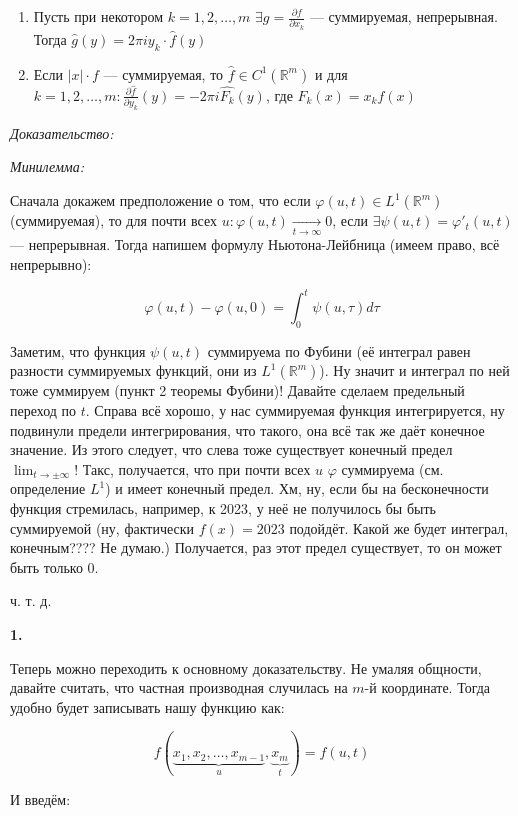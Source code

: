 \documentclass{article}
\def\dbl{\,\,}
\def\goesto#1{\underset{#1}{\longrightarrow}}
\begin{document}
\begin{enumerate}
    \item Пусть при некотором $k = 1, 2, \ldots, m \dbl \exists g = \frac{\partial f}{\partial x_k}$ --- суммируемая, непрерывная. Тогда $\hat{g}(y) = 2 \pi i y_k \cdot \hat{f}(y)$
    \item Если $|x| \cdot f$ --- суммируемая, то $\hat{f} \in C^1(\mathbb{R}^m)$ и для $k = 1, 2, \ldots, m: \frac{\partial \hat{f}}{\partial y_k}(y) = -2\pi i \hat{F_k}(y)$, где $F_k(x) = x_kf(x)$
\end{enumerate}

\textit{Доказательство:}

\textit{Минилемма:}

Сначала докажем предположение о том, что если $\varphi(u, t) \in L^1(\mathbb{R}^m)$ (суммируемая), то для почти всех $u : \varphi(u, t) \goesto{t \rightarrow \infty} 0$, если $\exists \psi(u, t) = \varphi'_t(u, t)$ --- непрерывная. Тогда напишем формулу Ньютона-Лейбница (имеем право, всё непрерывно):

\[\varphi(u, t) - \varphi(u, 0) = \int_{0}^{t} \psi(u, \tau) d\tau \]

Заметим, что функция $\psi(u, t)$ суммируема по Фубини (её интеграл равен разности суммируемых функций, они из $L^1(\mathbb{R}^m)$). Ну значит и интеграл по ней тоже суммируем (пункт 2 теоремы Фубини)! Давайте сделаем предельный переход по $t$. Справа всё хорошо, у нас суммируемая функция интегрируется, ну подвинули предели интегрирования, что такого, она всё так же даёт конечное значение. Из этого следует, что слева тоже существует конечный предел $\lim_{t \rightarrow \pm \infty}$! Такс, получается, что при почти всех $u \dbl \varphi$ суммируема (см. определение $L^1$) и имеет конечный предел. Хм, ну, если бы на бесконечности функция стремилась, например, к 2023, у неё не получилось бы быть суммируемой (ну, фактически $f(x) = 2023$ подойдёт. Какой же будет интеграл, конечным???? Не думаю.) Получается, раз этот предел существует, то он может быть только 0.

ч. т. д. 

\textbf{1.}

Теперь можно переходить к основному доказательству. Не умаляя общности, давайте считать, что частная производная случилась на $m$-й координате. Тогда удобно будет записывать нашу функцию как:

\[f(\underbrace{x_1, x_2, \ldots, x_{m - 1}}_{u}, \underbrace{x_m}_{t}) = f(u, t)\]

И введём:
\end{document}
